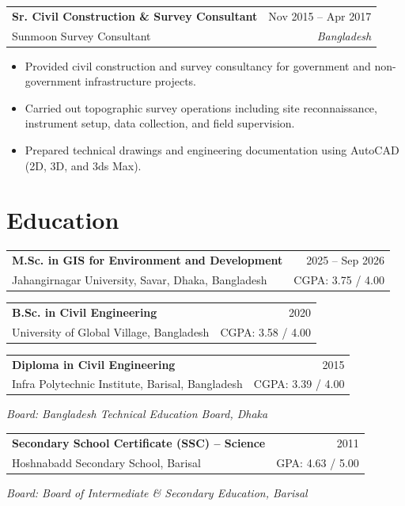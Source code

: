 \documentclass[10.5pt, a4paper]{article}
\makeatletter
\newcommand{\cventry}[4]{%
  \begin{tabularx}{\linewidth}{@{}X r@{}}
    {\bfseries\color{ddseNavy} #1} & {\footnotesize\color{ddseMid} #3} \\
    {\color{ddseBlue}\footnotesize #2} & {\footnotesize\color{ddseMid}\textit{#4}} \\
  \end{tabularx}%
}
\newcommand{\eduentry}[4]{%
  \begin{tabularx}{\linewidth}{@{}X r@{}}
    {\bfseries\color{ddseNavy} #1} & {\footnotesize\color{ddseMid} #3} \\
    {\color{ddseBlue}\footnotesize #2} & {\footnotesize\color{ddseMid} #4} \\
  \end{tabularx}%
}
\makeatother
\begin{document}
\vspace{4pt}

\cventry{Sr. Civil Construction \& Survey Consultant}{Sunmoon Survey Consultant}{Nov 2015 -- Apr 2017}{Bangladesh}

\vspace{1pt}
\begin{itemize}[leftmargin=1.2em, itemsep=1pt, topsep=1pt, parsep=0pt]
  \item Provided civil construction and survey consultancy for government and non-government infrastructure projects.
  \item Carried out topographic survey operations including site reconnaissance, instrument setup, data collection, and field supervision.
  \item Prepared technical drawings and engineering documentation using AutoCAD (2D, 3D, and 3ds Max).
\end{itemize}

\vspace{1pt}

\section{Education}

\eduentry{M.Sc. in GIS for Environment and Development}{Jahangirnagar University, Savar, Dhaka, Bangladesh}{2025 -- Sep 2026}{CGPA: 3.75 / 4.00}

\vspace{3pt}
\eduentry{B.Sc. in Civil Engineering}{University of Global Village, Bangladesh}{2020}{CGPA: 3.58 / 4.00}

\vspace{3pt}
\eduentry{Diploma in Civil Engineering}{Infra Polytechnic Institute, Barisal, Bangladesh}{2015}{CGPA: 3.39 / 4.00}

{\footnotesize\color{ddseMid}\hspace{0.5em}\textit{Board: Bangladesh Technical Education Board, Dhaka}}

\vspace{3pt}
\eduentry{Secondary School Certificate (SSC) -- Science}{Hoshnabadd Secondary School, Barisal}{2011}{GPA: 4.63 / 5.00}

{\footnotesize\color{ddseMid}\hspace{0.5em}\textit{Board: Board of Intermediate \& Secondary Education, Barisal}}

\vspace{1pt}
\end{document}
